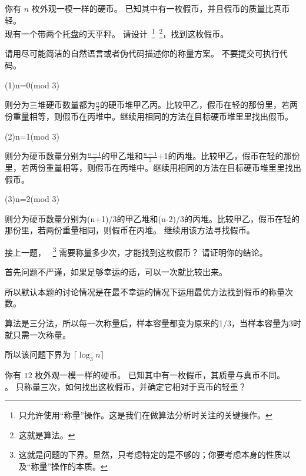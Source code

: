 \documentclass[a4paper, justified]{tufte-handout}
\begin{document}
\begin{problem}[$n$ 枚硬币]

你有 $n$ 枚外观一模一样的硬币。
已知其中有一枚假币，并且假币的质量比真币轻。\\
现有一个带两个托盘的天平秤。
请设计~\footnote{只允许使用``称量''操作。这是我们在做算法分析时关注的关键操作。}~\footnote{这就是算法。}，找到这枚假币。

请用尽可能简洁的自然语言或者伪代码描述你的称量方案。
不要提交可执行代码。
\end{problem}

\begin{solution}

  (1)n=0(mod 3)

  则分为三堆硬币数量都为$\frac{n}{3}$的硬币堆甲乙丙。比较甲乙，假币在轻的那份里，若两份重量相等，则假币在丙堆中。继续用相同的方法在目标硬币堆里里找出假币。

  (2)n=1(mod 3)

  则分为硬币数量分别为$\frac{n-1}{3}$的甲乙堆和$\frac{n-1}{3}$+1的丙堆。比较甲乙，假币在轻的那份里，若两份重量相等，则假币在丙堆中。继续用相同的方法在目标硬币堆里里找出假币。

  (3)n=2(mod 3)

  则分为硬币数量分别为(n+1)/3的甲乙堆和(n-2)/3的丙堆。比较甲乙，假币在轻的那份里，若两份重量相同，则假币在丙堆。  继续用该方法寻找假币。

\end{solution}

\begin{problem}[$n$ 枚硬币问题的下界]
接上一题，
~\footnote{这就是问题的下界。显然，只考虑特定的是不够的；你要考虑本身的性质以及``称量''操作的本质。}
需要称量多少次，才能找到这枚假币？
请证明你的结论。
\end{problem}

\begin{solution}
  首先问题不严谨，如果足够幸运的话，可以一次就比较出来。

  所以默认本题的讨论情况是在最不幸运的情况下运用最优方法找到假币的称量次数。

  算法是三分法，所以每一次称量后，样本容量都变为原来的1/3，当样本容量为3时就只需一次称量。

  所以该问题下界为  $\lceil \log_3 n \rceil$
\end{solution}

\begin{problem}
你有 $12$ 枚外观一模一样的硬币。
已知其中有一枚假币，其质量与真币不同。\\
。
只称量三次，如何找出这枚假币，并确定它相对于真币的轻重？

\end{problem}
\end{document}
